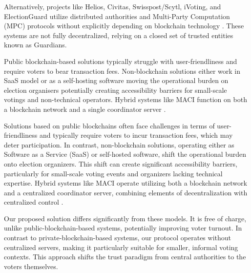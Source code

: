 \documentclass[runningheads]{llncs}
\begin{document}
Alternatively, projects like Helios, Civitas, Swisspost/Scytl, iVoting, and ElectionGuard utilize distributed authorities and Multi-Party Computation (MPC) protocols without explicitly depending on blockchain technology \cite{adidaHeliosWebbasedOpenAudit2008, clarksonCivitasSecureVoting2008, roenneJCJImprovedVerifiability2016, ElectionGuard}. These systems are not fully decentralized, relying on a closed set of trusted entities known as Guardians.

Public blockchain-based solutions typically struggle with user-friendliness and require voters to bear transaction fees. Non-blockchain solutions either work in SaaS model or as a self-hosting software moving the operational burden on election organisers potentially creating accessibility barriers for small-scale votings and non-technical operators. Hybrid systems like MACI function on both a blockchain network and a single coordinator server \cite{ethereumfoundationMinimalAntiCollusionInfrastructure2022, PrivacyscalingexplorationsMaci2023}.

Solutions based on public blockchains often face challenges in terms of user-friendliness and typically require voters to incur transaction fees, which may deter participation. In contrast, non-blockchain solutions, operating either as Software as a Service (SaaS) or self-hosted software, shift the operational burden onto election organizers. This shift can create significant accessibility barriers, particularly for small-scale voting events and organizers lacking technical expertise. Hybrid systems like MACI operate utilizing both a blockchain network and a centralized coordinator server, combining elements of decentralization with centralized control \cite{ethereumfoundationMinimalAntiCollusionInfrastructure2022, PrivacyscalingexplorationsMaci2023}.

Our proposed solution differs significantly from these models. It is free of charge, unlike public-blockchain-based systems, potentially improving voter turnout. In contrast to private-blockchain-based systems, our protocol operates without centralized servers, making it particularly suitable for smaller, informal voting contexts. This approach shifts the trust paradigm from central authorities to the voters themselves.


\newcommand{\fullmoon}{\tikz\filldraw[fill=black] (0,0) circle (0.5em);}
\newcommand{\newmoon}{\tikz\draw (0,0) circle (0.5em);}
\newcommand{\rightmoon}{\tikz\draw (0,0) circle (0.5em); \filldraw[fill=black] (0,0) arc (90:270:0.5em) -- cycle;}
\newcommand{\leftmoon}{\tikz\draw (0,0) circle (0.5em); \filldraw[fill=black] (0,0) arc (270:90:0.5em) -- cycle;}
\newcommand{\halfmoon}{\tikz\draw (0,0) circle (0.5em); \filldraw[fill=black] (0,-0.5em) rectangle (0,0.5em);}
\end{document}
